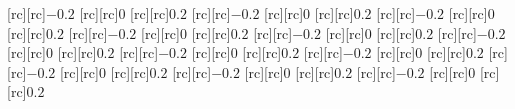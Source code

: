 [rc][rc]{\matlabtextA $-0.2$}%
[rc][rc]{\matlabtextA $0$}%
[rc][rc]{\matlabtextA $0.2$}%
[rc][rc]{\matlabtextA $-0.2$}%
[rc][rc]{\matlabtextA $0$}%
[rc][rc]{\matlabtextA $0.2$}%
[rc][rc]{\matlabtextA $-0.2$}%
[rc][rc]{\matlabtextA $0$}%
[rc][rc]{\matlabtextA $0.2$}%
[rc][rc]{\matlabtextA $-0.2$}%
[rc][rc]{\matlabtextA $0$}%
[rc][rc]{\matlabtextA $0.2$}%
[rc][rc]{\matlabtextA $-0.2$}%
[rc][rc]{\matlabtextA $0$}%
[rc][rc]{\matlabtextA $0.2$}%
[rc][rc]{\matlabtextA $-0.2$}%
[rc][rc]{\matlabtextA $0$}%
[rc][rc]{\matlabtextA $0.2$}%
[rc][rc]{\matlabtextA $-0.2$}%
[rc][rc]{\matlabtextA $0$}%
[rc][rc]{\matlabtextA $0.2$}%
[rc][rc]{\matlabtextA $-0.2$}%
[rc][rc]{\matlabtextA $0$}%
[rc][rc]{\matlabtextA $0.2$}%
[rc][rc]{\matlabtextA $-0.2$}%
[rc][rc]{\matlabtextA $0$}%
[rc][rc]{\matlabtextA $0.2$}%
[rc][rc]{\matlabtextA $-0.2$}%
[rc][rc]{\matlabtextA $0$}%
[rc][rc]{\matlabtextA $0.2$}%
[rc][rc]{\matlabtextA $-0.2$}%
[rc][rc]{\matlabtextA $0$}%
[rc][rc]{\matlabtextA $0.2$}%
%

